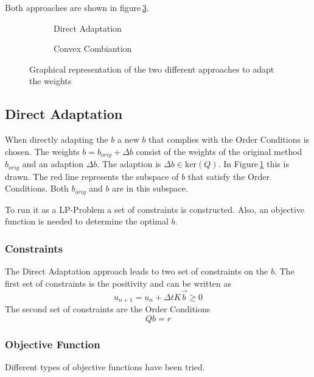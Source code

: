 \documentclass[a4paper]{scrartcl}
\numberwithin{equation}{section}
\theoremstyle{plain}
\theoremstyle{definition}
\numberwithin{theorem}{section}
\newcommand{\dt}{{\Delta t}}
\newcommand{\1}{\mathbbm{1}}
\begin{document}
Both approaches are shown in figure\,\ref{fig:b_space}.


\begin{figure}
    \centering
    \begin{subfigure}[b]{0.45\textwidth}
        
        \caption{Direct Adaptation}
        \label{fig:b_direct}
    \end{subfigure}
    \begin{subfigure}[b]{0.45\textwidth}
        
        \caption{Convex Combiantion}
        \label{fig:b_convex}
    \end{subfigure}
    \caption{Graphical representation of the two different approaches to adapt the weights}\label{fig:b_space}
\end{figure}

\subsection{Direct Adaptation}\label{sec:direct}

When directly adapting the $b$ a new $b$ that complies with the Order Conditions is chosen.   
The weights $b = b_{orig} + \Delta b$ consist of the weights of the original method $b_{orig}$ and an adaption $\Delta b$. The adaption is $\Delta b \in \mathrm{ker}(Q)$. 
In Figure\,\ref{fig:b_direct} this is drawn. The red line represents the subspace of $b$ that satisfy the Order Conditions. Both $b_{orig}$ and $b$ are in this subspace. 
 
To run it as a LP-Problem a set of constraints is constructed.  
Also, an objective function is needed to determine the optimal $b$.

\subsubsection{Constraints}
The Direct Adaptation approach leads to two set of constraints on the $b$.
The first set of constraints is the positivity and can be written as 
\begin{equation}
u_{n+1}=u_n+\dt K \vec{b} \geq 0
\end{equation}
The second set of constraints are the Order Conditions
\begin{equation}
Qb=r
\end{equation}





\subsubsection{Objective Function}
Different types of objective functions have been tried. 
\end{document}
